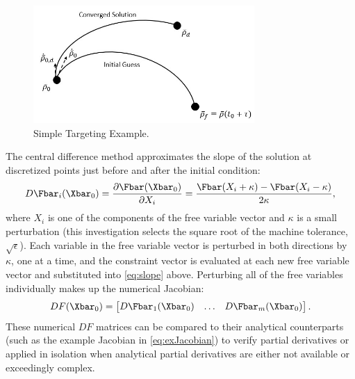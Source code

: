 \begin{figure}[H]
    \centering
    \includegraphics[width=0.75\textwidth]{figures/Targeting.jpg}
    \caption{Simple Targeting Example.}
    \label{fig:targeting}
\end{figure}

The central difference method approximates the slope of the solution at discretized points just
before and after the initial condition:
\begin{equation}
    D\Fbar_{i}(\Xbar_{0})=\frac{\partial\Fbar(\Xbar_{0})}{\partial X_{i}}=\frac{\Fbar(X_{i}+\kappa)-\Fbar(X_{i}-\kappa)}{2\kappa},
    \label{eq:slope}
\end{equation}
where $X_{i}$ is one of the components of the free variable vector and $\kappa$ is a small
perturbation (this investigation selects the square root of the machine tolerance,
$\sqrt{\epsilon}$). Each variable in the free variable vector is perturbed in both directions by
$\kappa$, one at a time, and the constraint vector is evaluated at each new free variable vector
and substituted into \cref{eq:slope} above. Perturbing all of the free variables individually makes
up the numerical Jacobian:
\begin{equation}
    DF(\Xbar_{0})=\begin{bmatrix}   D\Fbar_{1}(\Xbar_{0})   &   \dots   &   D\Fbar_{m}(\Xbar_{0})\end{bmatrix}.
    \label{eq:centraldifference}
\end{equation}
These numerical $DF$ matrices can be compared to their analytical counterparts (such as the example
Jacobian in \cref{eq:exJacobian}) to verify partial derivatives or applied in isolation when
analytical partial derivatives are either not available or exceedingly complex.
